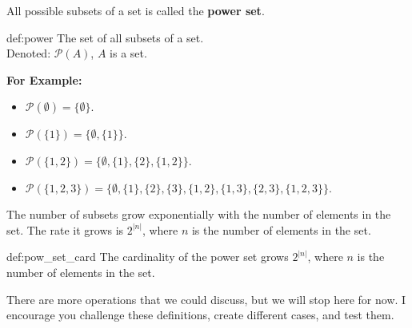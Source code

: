\noindent
All possible subsets of a set is called the \textbf{power set}.
\begin{Def}{def:power}
    The set of all subsets of a set.\\
    Denoted: $\mathcal{P}(A)$, $A$ is a set.
\end{Def}

\noindent
\textbf{For Example:}
\begin{itemize}
    \item $\mathcal{P}(\emptyset) = \{\emptyset\}$.
    \item $\mathcal{P}(\{1\}) = \{\emptyset, \{1\}\}$.
    \item $\mathcal{P}(\{1, 2\}) = \{\emptyset, \{1\}, \{2\}, \{1, 2\}\}$.
    \item $\mathcal{P}(\{1, 2, 3\}) = \{\emptyset, \{1\}, \{2\}, \{3\}, \{1, 2\}, \{1, 3\}, \{2, 3\}, \{1, 2, 3\}\}$.
\end{itemize}

\noindent
The number of subsets grow exponentially with the number of elements in the set.
The rate it grows is $2^{|n|}$, where $n$ is the number of elements in the set.

\begin{Def}{def:pow_set_card}
    The cardinality of the power set grows $2^{|n|}$, where $n$ is the number of elements in the set.
\end{Def}

\noindent
There are more operations that we could discuss, but we will stop here for now.
I encourage you challenge these definitions, create different cases, and test them.\\
